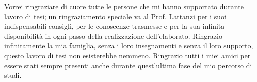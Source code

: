\documentclass[a4paper,singleside,11pt]{report}
\begin{document}

\copertinatesi 
{}
\indice
\indicefigure
\indicetabelle
\iniziatesto






%
%
%

\appendix
% 


\ringraziamenti
Vorrei ringraziare di cuore tutte le persone che mi hanno supportato durante lavoro di tesi; un ringraziamento speciale va al Prof. Lattanzi per i suoi indispensabili consigli, per le conoscenze trasmesse e per la sua infinita disponibilità in ogni passo della realizzazione dell’elaborato.
Ringrazio infinitamente la mia famiglia, senza i loro insegnamenti e senza il loro supporto, questo lavoro di tesi non esisterebbe nemmeno.
Ringrazio tutti i miei amici per essere stati sempre presenti anche durante quest’ultima fase del mio percorso di studi.
\end{document}
